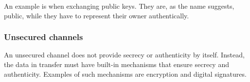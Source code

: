 An example is when exchanging public keys. They are, as the name suggests, public, while they have to represent their owner authentically.

\subsubsection{Unsecured channels}
An unsecured channel does not provide secrecy or authenticity by itself. Instead, the data in transfer must have built-in mechanisms that ensure secrecy and authenticity. Examples of such mechanisms are encryption and digital signatures.
